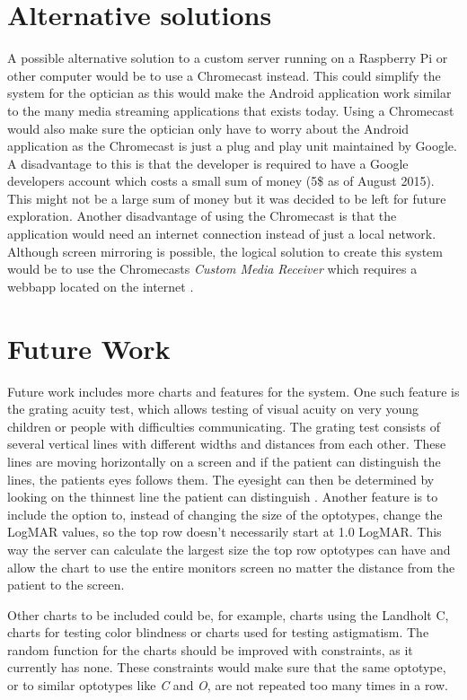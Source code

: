 \documentclass[12pt,a4paper,notitlepage]{report}
\begin{document}
\section{Alternative solutions}
A possible alternative solution to a custom server running on a Raspberry Pi or other computer would be to use a Chromecast instead. This could simplify the system for the optician as this would make the Android application work similar to the many media streaming applications that exists today. Using a Chromecast would also make sure the optician only have to worry about the Android application as the Chromecast is just a plug and play unit maintained by Google. A disadvantage to this is that the developer is required to have a Google developers account which costs a small sum of money (5\$ as of August 2015). This might not be a large sum of money but it was decided to be left for future exploration. Another disadvantage of using the Chromecast is that the application would need an internet connection instead of just a local network. Although screen mirroring is possible, the logical solution to create this system would be to use the Chromecasts \textit{Custom Media Receiver} which requires a webbapp located on the internet \cite{android_receiver_app}.

\section{Future Work}
Future work includes more charts and features for the system. One such feature is the grating acuity test, which allows testing of visual acuity on very young children or people with difficulties communicating. The grating test consists of several vertical lines with different widths and distances from each other. These lines are moving horizontally on a screen and if the patient can distinguish the lines, the patients eyes follows them. The eyesight can then be determined by looking on the thinnest line the patient can distinguish \cite{PGSoderbergOral}. Another feature is to include the option to, instead of changing the size of the optotypes, change the LogMAR values, so the top row doesn't necessarily start at 1.0 LogMAR. This way the server can calculate the largest size the top row optotypes can have and allow the chart to use the entire monitors screen no matter the distance from the patient to the screen.

Other charts to be included could be, for example, charts using the Landholt C, charts for testing color blindness or charts used for testing astigmatism. The random function for the charts should be improved with constraints, as it currently has none. These constraints would make sure that the same optotype, or to similar optotypes like \textit{C} and \textit{O}, are not repeated too many times in a row.
\end{document}
